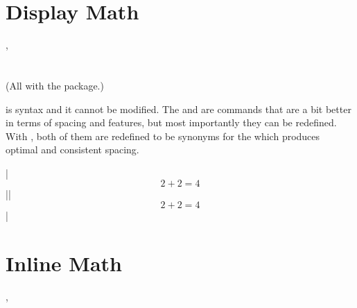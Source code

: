 
\NewCommandCopy{\oldsec}{\section}
\ExplSyntaxOff

\section{Display Math}\label{sec:display_math}
\instead{
\ai{\$\$}
} {
\csi{[}, \csi{]} \\
\\
\\
(All with the  package.)
}

\ai{\$\$} is  syntax and it cannot be modified. The
 and \csi{[} are  commands that are a bit better
in terms of spacing and features, but most importantly they can be redefined.
With , both of them are redefined to be synonyms for the
 which produces optimal and consistent spacing.

\chto|$$ 2 + 2 = 4 $$||\[ 2 + 2 = 4 \]| %

\section{Inline Math}
\instead{
  \ai{\$}
} {
  \csi{(}, \csi{)}
}

